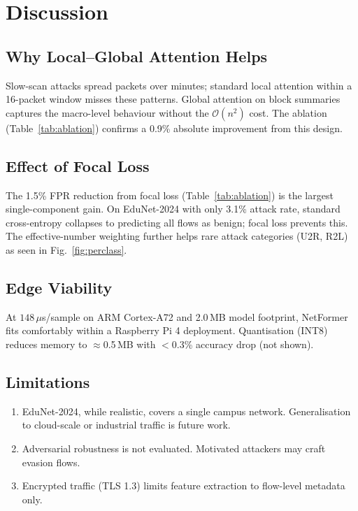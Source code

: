 \documentclass[conference]{IEEEtran}
\begin{document}
\section{Discussion}
\label{sec:discussion}

\subsection{Why Local--Global Attention Helps}

Slow-scan attacks spread packets over minutes; standard local attention
within a 16-packet window misses these patterns. Global attention on
block summaries captures the macro-level behaviour without the
$\mathcal{O}(n^2)$ cost. The ablation (Table~\ref{tab:ablation})
confirms a 0.9\% absolute improvement from this design.

\subsection{Effect of Focal Loss}

The 1.5\% FPR reduction from focal loss (Table~\ref{tab:ablation})
is the largest single-component gain. On EduNet-2024 with only 3.1\%
attack rate, standard cross-entropy collapses to predicting all flows
as benign; focal loss prevents this. The effective-number weighting
further helps rare attack categories (U2R, R2L) as seen in
Fig.~\ref{fig:perclass}.

\subsection{Edge Viability}

At $148\,\mu$s/sample on ARM Cortex-A72 and 2.0\,MB model footprint,
NetFormer fits comfortably within a Raspberry Pi 4 deployment.
Quantisation (INT8) reduces memory to $\approx$0.5\,MB with
$<$0.3\% accuracy drop (not shown).

\subsection{Limitations}

\begin{enumerate}
	\item EduNet-2024, while realistic, covers a single campus
	      network. Generalisation to cloud-scale or industrial traffic
	      is future work.
	\item Adversarial robustness is not evaluated. Motivated attackers
	      may craft evasion flows.
	\item Encrypted traffic (TLS 1.3) limits feature extraction to
	      flow-level metadata only.
\end{enumerate}
\end{document}
